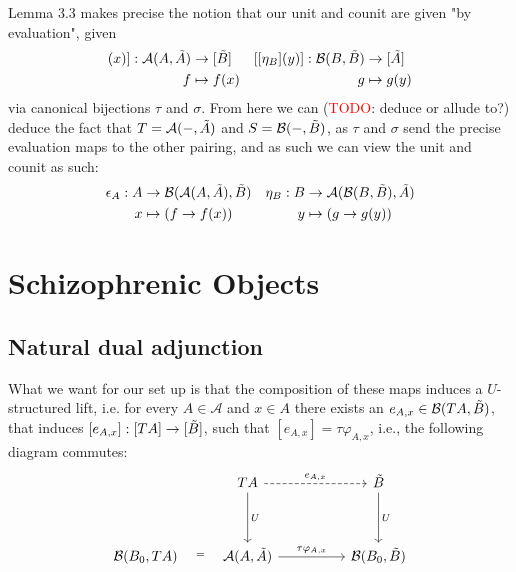 \documentclass[12pt,a4paper]{article}
\def\HomA{\ensuremath\mathcal{A}}
\def\HomB{\ensuremath\mathcal{B}}
\def\t{\ensuremath\tilde}
\begin{document}
Lemma 3.3 makes precise the notion that our unit and counit are given "by evaluation", given
\begin{align*}
	[[\epsilon_A](x)]: \HomA(A, \t A) &\to [\t B] & [[\eta_B](y)]:\HomB(B, \t B) &\to [\t A]\\
	f &\mapsto f(x) & g &\mapsto g(y) 
\end{align*}
via canonical bijections $\tau$ and $\sigma$. From here we can (\textcolor{red}{TODO}: deduce or allude to?) deduce the fact that $T = \HomA(-, \t A)$ and $S = \HomB(-, \t B)$, as $\tau$ and $\sigma$ send the precise evaluation maps to the other pairing, and as such we can view the unit and counit as such:
\begin{align*}
	\epsilon_A:  A&\to \HomB(\HomA(A, \t A),\t B) & \eta_B: B&\to \HomA(\HomB(B, \t B),\t A)\\
	x &\mapsto (f \to f(x)) & y &\mapsto (g\to g(y) )
\end{align*}
\section{Schizophrenic Objects}
\subsection{Natural dual adjunction}
What we want for our set up is that the composition of these maps induces a $U$-structured lift, i.e. for every $A \in \mathcal{A}$ and  $x \in A$ there exists an $e_{A,x} \in \HomB(TA, \t B)$, that induces  $[e_{A,x}]: [TA] \to [\t B]$, such that $[e_{A,x}] = \tau \varphi_{A,x}$, i.e., the following diagram commutes: 
\[\begin{tikzcd}
	& TA && {\t B} \\
	\\
	{\HomB(B_0, TA)} & {\HomA(A, \t A)} && {\HomB(B_0, \t B)}
	\arrow["e_{A,x}",dashed, from=1-2, to=1-4]
	\arrow["U", from=1-2, to=3-2]
	\arrow["U", from=1-4, to=3-4]
	\arrow["{=}", shift right=1, draw=none, from=3-1, to=3-2]
	\arrow["{\tau \varphi_{A,x}}", from=3-2, to=3-4]
\end{tikzcd}\]
\end{document}
